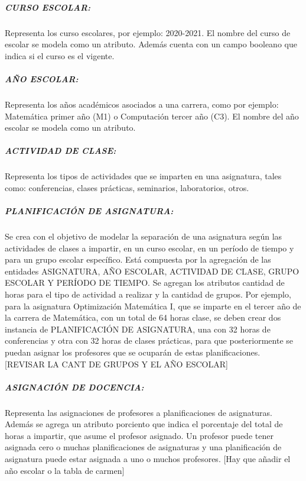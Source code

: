 \subparagraph{CURSO ESCOLAR:}
Representa los curso escolares, por ejemplo: 2020-2021.
El nombre del curso de escolar se modela como un atributo. Además 
cuenta con un campo booleano que indica si el curso es el vigente.

\subparagraph{AÑO ESCOLAR:}
Representa los años académicos asociados a una carrera, como por ejemplo:
Matemática primer año (M1) o Computación tercer año (C3).
El nombre del año escolar se modela como un atributo.

\subparagraph{ACTIVIDAD DE CLASE:}
Representa los tipos de actividades que se imparten en una asignatura, 
tales como: conferencias, clases prácticas, seminarios, laboratorios, otros. 


\subparagraph{PLANIFICACIÓN DE ASIGNATURA:}
Se crea con el objetivo de modelar la separación de una asignatura
según las actividades de clases a impartir, en un curso escolar, en un período de tiempo y para
un grupo escolar específico. Está compuesta por la agregación de las entidades ASIGNATURA, AÑO ESCOLAR, ACTIVIDAD DE CLASE, GRUPO 
ESCOLAR Y PERÍODO DE TIEMPO.
Se agregan los atributos cantidad de horas para el tipo de actividad a realizar y 
la cantidad de grupos.
Por ejemplo, para la asignatura Optimización Matemática I, que se imparte 
en el tercer año de la carrera de Matemática, con un total de 64 horas clase, 
se deben crear dos instancia de PLANIFICACIÓN DE ASIGNATURA, una con 32 horas 
de conferencias y otra con 32 horas de clases prácticas, para que posteriormente
se puedan asignar los profesores que se ocuparán de estas planificaciones. 
[REVISAR LA CANT DE GRUPOS Y EL AÑO ESCOLAR]






\subparagraph{ASIGNACIÓN DE DOCENCIA:}
Representa las asignaciones de profesores a planificaciones de asignaturas.
Además se agrega un atributo porciento que indica el porcentaje del total de horas 
a impartir, que asume el profesor asignado. Un profesor puede 
tener asignada cero o muchas planificaciones de asignaturas y una planificación de 
asignatura puede estar asignada a uno o muchos profesores.
[Hay que añadir el año escolar o la tabla de carmen]


